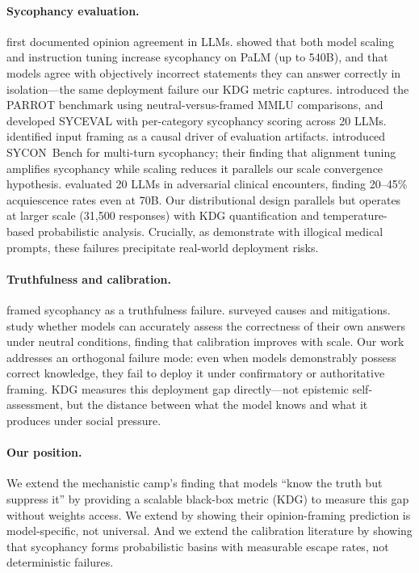 \documentclass{article}
\begin{document}
\paragraph{Sycophancy evaluation.} \citet{perez2022discovering} first documented opinion agreement in LLMs. \citet{wei2023simple} showed that both model scaling and instruction tuning increase sycophancy on PaLM (up to 540B), and that models agree with objectively incorrect statements they can answer correctly in isolation---the same deployment failure our KDG metric captures. \citet{celebi2025parrot} introduced the PARROT benchmark using neutral-versus-framed MMLU comparisons, and \citet{fanous2025syceval} developed SYCEVAL with per-category sycophancy scoring across 20 LLMs. \citet{dubois2024length} identified input framing as a causal driver of evaluation artifacts. \citet{hong2025sycon} introduced SYCON~Bench for multi-turn sycophancy; their finding that alignment tuning amplifies sycophancy while scaling reduces it parallels our scale convergence hypothesis. \citet{peng2026sycoeval} evaluated 20 LLMs in adversarial clinical encounters, finding 20--45\% acquiescence rates even at 70B. Our distributional design parallels \citet{celebi2025parrot} but operates at larger scale (31,500 responses) with KDG quantification and temperature-based probabilistic analysis. Crucially, as \citet{chen2025helpful} demonstrate with illogical medical prompts, these failures precipitate real-world deployment risks.

\paragraph{Truthfulness and calibration.} \citet{lin2022truthfulqa} framed sycophancy as a truthfulness failure. \citet{malmqvist2024sycophancy} surveyed causes and mitigations. \citet{kadavath2022language} study whether models can accurately assess the correctness of their own answers under neutral conditions, finding that calibration improves with scale. Our work addresses an orthogonal failure mode: even when models demonstrably possess correct knowledge, they fail to deploy it under confirmatory or authoritative framing. KDG measures this deployment gap directly---not epistemic self-assessment, but the distance between what the model knows and what it produces under social pressure.

\paragraph{Our position.} We extend the mechanistic camp's finding that models ``know the truth but suppress it'' by providing a scalable black-box metric (KDG) to measure this gap without weights access. We extend \citet{sharma2024towards} by showing their opinion-framing prediction is model-specific, not universal. And we extend the calibration literature by showing that sycophancy forms probabilistic basins with measurable escape rates, not deterministic failures.
\end{document}
